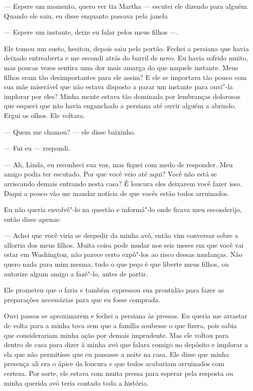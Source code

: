 --- Espere um momento, quero ver tia Martha --- escutei ele dizendo para
alguém. Quando ele saiu, eu disse enquanto passava pela janela

--- Espere um instante, deixe eu falar pelos meus filhos ---.

Ele tomou um susto, hesitou, depois saiu pelo portão. Fechei a persiana
que havia deixado entreaberta e me escondi atrás do barril de novo. Eu
havia sofrido muito, mas poucas vezes sentira uma dor mais amarga do que
naquele instante. Meus filhos eram tão desimportantes para ele assim? E
ele se importava tão pouco com sua mãe miserável que não estava disposto
a parar um instante para ouvi"-la implorar por eles? Minha mente estava
tão dominada por lembranças dolorosas que esqueci que não havia
enganchado a persiana até ouvir alguém a abrindo. Ergui os olhos. Ele
voltara.

--- Quem me chamou? --- ele disse baixinho.

--- Fui eu --- respondi.

--- Ah, Linda, eu reconheci sua voz, mas fiquei com medo de responder.
Meu amigo podia ter escutado. Por que você veio até aqui? Você não está
se arriscando demais entrando nesta casa? É loucura eles deixarem você
fazer isso. Daqui a pouco vão me mandar notícia de que vocês estão todos
arruinados.

Eu não queria envolvê"-lo na questão e informá"-lo onde ficava meu
esconderijo, então disse apenas:

--- Achei que você viria se despedir da minha avó, então vim conversar
sobre a alforria dos meus filhos. Muita coisa pode mudar nos seis meses
em que você vai estar em Washington, não parece certo expô"-los ao risco
dessas mudanças. Não quero nada para mim mesma, tudo o que peço é que
liberte meus filhos, ou autorize algum amigo a fazê"-lo, antes de partir.

Ele prometeu que o faria e também
expressou sua prontidão para fazer as preparações necessárias para que
eu fosse comprada.

Ouvi passos se aproximarem e fechei a
persiana às pressas. Eu queria me arrastar de volta para a minha toca
sem que a família soubesse o que fizera, pois sabia que considerariam
minha ação por demais imprudente. Mas ele voltou para dentro de casa
para dizer à minha avó que falara comigo no depósito e implorar a ela
que não permitisse que eu passasse a noite na casa. Ele disse que minha
presença ali era o ápice da loucura e que todos acabariam arruinados com
certeza. Por sorte, ele estava com muita pressa para esperar pela
resposta ou minha querida avó teria contado toda a história.

